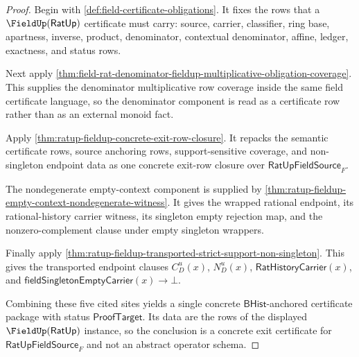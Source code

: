 \begin{proof}
Begin with \autoref{def:field-certificate-obligations}. It fixes the rows that a
$\FieldUp(\mathsf{RatUp})$ certificate must carry: source, carrier, classifier,
ring base, apartness, inverse, product, denominator, contextual denominator,
affine, ledger, exactness, and status rows.

Next apply
\autoref{thm:field-rat-denominator-fieldup-multiplicative-obligation-coverage}.
This supplies the denominator multiplicative row coverage inside the same field
certificate language, so the denominator component is read as a certificate row
rather than as an external monoid fact.

Apply \autoref{thm:ratup-fieldup-concrete-exit-row-closure}. It repacks the
semantic certificate rows, source anchoring rows, support-sensitive coverage, and
non-singleton endpoint data as one concrete exit-row closure over
$\mathsf{RatUpFieldSource}_F$.

The nondegenerate empty-context component is supplied by
\autoref{thm:ratup-fieldup-empty-context-nondegenerate-witness}. It gives the
wrapped rational endpoint, its rational-history carrier witness, its singleton
empty rejection map, and the nonzero-complement clause under empty singleton
wrappers.

Finally apply
\autoref{thm:ratup-fieldup-transported-strict-support-non-singleton}. This gives
the transported endpoint clauses $C_D^u(x)$, $N_D^u(x)$,
$\mathsf{RatHistoryCarrier}(x)$, and
$\mathsf{fieldSingletonEmptyCarrier}(x)\to\bot$.

Combining these five cited sites yields a single concrete
$\mathsf{BHist}$-anchored certificate package with status
$\mathsf{ProofTarget}$. Its data are the rows of the displayed
$\FieldUp(\mathsf{RatUp})$ instance, so the conclusion is a concrete exit
certificate for $\mathsf{RatUpFieldSource}_F$ and not an abstract operator
schema.
\end{proof}

